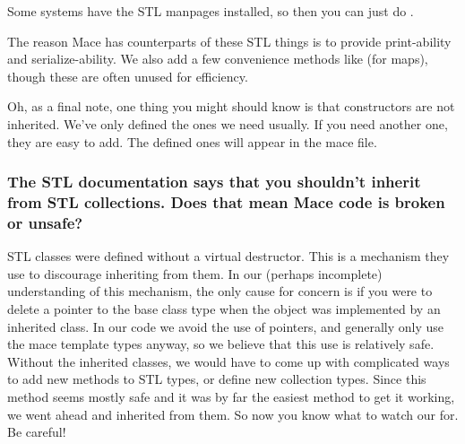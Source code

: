 Some systems have the STL manpages installed, so then you can just do
.

The reason Mace has counterparts of these STL things is to provide
print-ability and serialize-ability.  We also add a few convenience
methods like  (for maps), though these are often
unused for efficiency.

Oh, as a final note, one thing you might should know is that
constructors are not inherited.  We've only defined the ones we need
usually.  If you need another one, they are easy to add.  The defined
ones will appear in the mace  file.

\subsubsection*{The STL documentation says that you shouldn't inherit
from STL collections.  Does that mean Mace code is broken or unsafe?}

STL classes were defined without a virtual destructor.  This is a
mechanism they use to discourage inheriting from them.  In our (perhaps
incomplete) understanding of this mechanism, the only cause for concern
is if you were to delete a pointer to the base class type when the
object was implemented by an inherited class.  In our code we avoid the
use of pointers, and generally only use the mace template types anyway,
so we believe that this use is relatively safe.  Without the inherited
classes, we would have to come up with complicated ways to add new
methods to STL types, or define new collection types.  Since this method
seems mostly safe and it was by far the easiest method to get it
working, we went ahead and inherited from them.  So now you know what to
watch our for.  Be careful!

